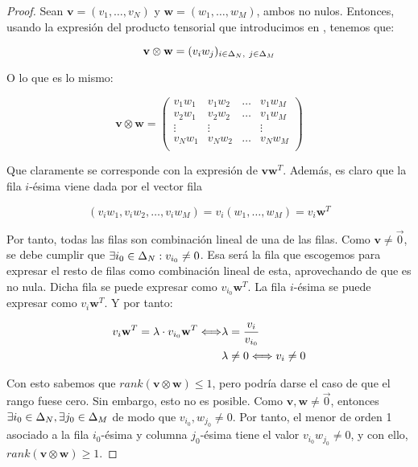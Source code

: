 \begin{proof}

Sean $\mathbf{v} = (v_1, \ldots, v_N)$ y $\mathbf{w} = (w_1, \ldots, w_M)$, ambos no nulos. Entonces, usando la expresión del producto tensorial que introducimos en , tenemos que:

\begin{equation}
    \mathbf{v} \otimes \mathbf{w} = (v_i w_j)_{i \in \Delta_{N},\ j \in \Delta_{M}}
\end{equation}

O lo que es lo mismo:

\begin{equation}
    \mathbf{v} \otimes \mathbf{w} = \begin{pmatrix}
        v_1 w_1 & v_1 w_2 & \ldots & v_1 w_M \\
        v_2 w_1 & v_2 w_2 & \ldots & v_1 w_M \\
        \vdots  & \vdots & & \vdots \\
        v_N w_1 & v_N w_2 & \ldots & v_N w_M \\
    \end{pmatrix}
\end{equation}

Que claramente se corresponde con la expresión de $\mathbf{v} \mathbf{w}^T$. Además, es claro que la fila $i$-ésima viene dada por el vector fila

$$(v_i w_1, v_i w_2, \ldots, v_i w_M) = v_i (w_1, \ldots, w_M) = v_i \mathbf{w}^T$$

Por tanto, todas las filas son combinación lineal de una de las filas. Como $\mathbf{v} \neq \vec{0}$, se debe cumplir que $\exists i_0 \in \Delta_{N}: v_{i_0} \neq 0$. Esa será la fila que escogemos para expresar el resto de filas como combinación lineal de esta, aprovechando de que es no nula. Dicha fila se puede expresar como $v_{i_0} \mathbf{w}^T$. La fila $i$-ésima se puede expresar como $v_i \mathbf{w}^T$. Y por tanto:

\begin{equation}
\begin{split}
    v_i \mathbf{w}^T = \lambda \cdot v_{i_0} \mathbf{w}^T \Longleftrightarrow & \lambda = \frac{v_i}{v_{i_0}} \\
                                                               & \lambda \neq 0 \Longleftrightarrow v_i \neq 0
\end{split}
\end{equation}

Con esto sabemos que $rank(\mathbf{v} \otimes \mathbf{w}) \leq 1$, pero podría darse el caso de que el rango fuese cero. Sin embargo, esto no es posible. Como $\mathbf{v}, \mathbf{w} \neq \vec{0}$, entonces $\exists i_0 \in \Delta_{N}, \exists j_0 \in \Delta_{M}$ de modo que $v_{i_0}, w_{j_0} \neq 0$. Por tanto, el menor de orden 1 asociado a la fila $i_0$-ésima y columna $j_0$-ésima tiene el valor $v_{i_0} w_{j_0} \neq 0$, y con ello, $rank(\mathbf{v} \otimes \mathbf{w}) \geq 1$.

\end{proof}

